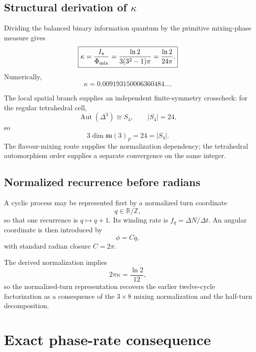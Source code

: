 \subsection{Structural derivation of \(\kappa\)}

Dividing the balanced binary information quantum by the primitive mixing-phase
measure gives
\begin{equation}
\boxed{
\kappa
=\frac{I_\star}{\Phi_{\rm mix}}
=\frac{\ln2}{3(3^2-1)\pi}
=\frac{\ln2}{24\pi}.
}
\label{eq:kappa_construction}
\end{equation}
Numerically,
\[
\kappa=0.009193150006360484\ldots .
\]

The local spatial branch supplies an independent finite-symmetry crosscheck:
for the regular tetrahedral cell,
\[
\operatorname{Aut}(\Delta^3)\cong S_4,
\qquad |S_4|=24,
\]
so
\[
\boxed{
3\dim\mathfrak{su}(3)_F
=24
=|S_4|.
}
\]
The flavour-mixing route supplies the normalization dependency; the tetrahedral
automorphism order supplies a separate convergence on the same integer.

\subsection{Normalized recurrence before radians}

A cyclic process may be represented first by a normalized turn coordinate
\begin{equation}
q\in\mathbb R/\mathbb Z,
\end{equation}
so that one recurrence is $q\mapsto q+1$. Its winding rate is
$f_q=\Delta N/\Delta t$. An angular coordinate is then introduced by
\begin{equation}
\phi=Cq,
\end{equation}
with standard radian closure $C=2\pi$.

The derived normalization implies
\begin{equation}
2\pi\kappa=\frac{\ln2}{12},
\label{eq:info-per-projective-turn}
\end{equation}
so the normalized-turn representation recovers the earlier twelve-cycle
factorization as a consequence of the $3\times8$ mixing normalization and the
half-turn decomposition.

\section{Exact phase-rate consequence}

